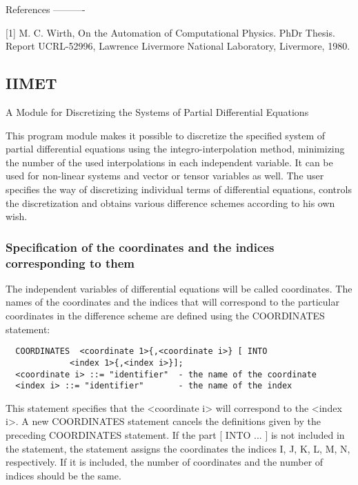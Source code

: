References
----------

[1] M. C. Wirth, On the Automation of Computational Physics. PhDr
          Thesis. Report UCRL-52996, Lawrence Livermore National
          Laboratory, Livermore, 1980.




\subsection{IIMET}



                 A Module for Discretizing the Systems
                   of Partial Differential Equations



     This program module makes it possible  to discretize  the specified
system of partial differential equations using the integro-interpolation
method,  minimizing  the  number  of  the  used  interpolations  in each
independent variable.  It can  be used for non-linear systems and vector
or tensor variables as well.  The user specifies the way of discretizing
individual terms  of differential equations, controls the discretization
and obtains various difference schemes according to his own wish.


\subsubsection{Specification of the coordinates and the indices corresponding to them}

     The independent variables of differential equations  will be called
coordinates.  The  names  of  the  coordinates and the indices that will
correspond to the particular  coordinates in  the difference  scheme are
defined using the COORDINATES statement:
\begin{verbatim}
  COORDINATES  <coordinate 1>{,<coordinate i>} [ INTO
             <index 1>{,<index i>}];
  <coordinate i> ::= "identifier"  - the name of the coordinate
  <index i> ::= "identifier"       - the name of the index
\end{verbatim}
This statement  specifies that the <coordinate i> will correspond to the
<index i>. A new COORDINATES statement cancels the  definitions given by
the preceding  COORDINATES statement.  If the  part [  INTO ... ] is not
included in the statement, the  statement  assigns  the  coordinates the
indices I, J, K, L, M, N, respectively. If it is included, the number of
coordinates and the number of indices should be the same.



